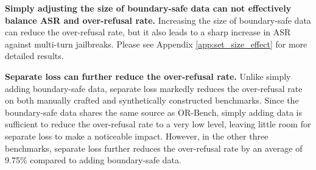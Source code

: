 \textbf{Simply adjusting the size of boundary-safe data can not effectively balance ASR and over-refusal rate.}
%
Increasing the size of boundary-safe data can reduce the over-refusal rate, but it also leads to a sharp increase in ASR against multi-turn jailbreaks.
%
Please see Appendix \ref{app:set_size_effect} for more detailed results.

\textbf{Separate loss can further reduce the over-refusal rate.}
%
Unlike simply adding boundary-safe data, separate loss markedly reduces the over-refusal rate on both manually crafted and synthetically constructed benchmarks.
%
Since the boundary-safe data shares the same source as OR-Bench, simply adding data is sufficient to reduce the over-refusal rate to a very low level, leaving little room for separate loss to make a noticeable impact. 
%
However, in the other three benchmarks, separate loss further reduces the over-refusal rate by an average of 9.75\% compared to adding boundary-safe data.